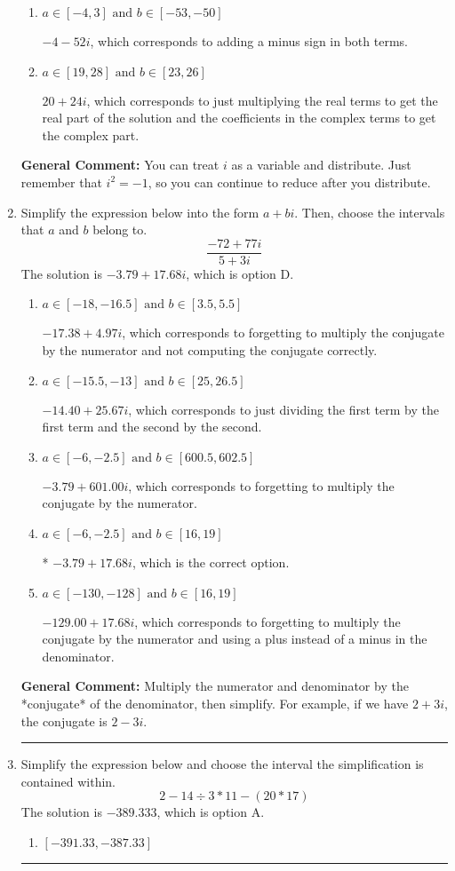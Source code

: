 \documentclass{extbook}[14pt]
\newcommand{\litem}[1]{\item #1

\rule{\textwidth}{0.4pt}}
\begin{document}
\begin{enumerate}
{\begin{enumerate}[label=\Alph*.]
* $-4 + 52 i$, which is the correct option.
\item \( a \in [-4, 3] \text{ and } b \in [-53, -50] \)

 $-4 - 52 i$, which corresponds to adding a minus sign in both terms.
\item \( a \in [19, 28] \text{ and } b \in [23, 26] \)

 $20 + 24 i$, which corresponds to just multiplying the real terms to get the real part of the solution and the coefficients in the complex terms to get the complex part.
\end{enumerate}

\textbf{General Comment:} You can treat $i$ as a variable and distribute. Just remember that $i^2=-1$, so you can continue to reduce after you distribute.
}
\litem{
Simplify the expression below into the form $a+bi$. Then, choose the intervals that $a$ and $b$ belong to.
\[ \frac{-72 + 77 i}{5 + 3 i} \]The solution is \( -3.79  + 17.68 i \), which is option D.\begin{enumerate}[label=\Alph*.]
\item \( a \in [-18, -16.5] \text{ and } b \in [3.5, 5.5] \)

 $-17.38  + 4.97 i$, which corresponds to forgetting to multiply the conjugate by the numerator and not computing the conjugate correctly.
\item \( a \in [-15.5, -13] \text{ and } b \in [25, 26.5] \)

 $-14.40  + 25.67 i$, which corresponds to just dividing the first term by the first term and the second by the second.
\item \( a \in [-6, -2.5] \text{ and } b \in [600.5, 602.5] \)

 $-3.79  + 601.00 i$, which corresponds to forgetting to multiply the conjugate by the numerator.
\item \( a \in [-6, -2.5] \text{ and } b \in [16, 19] \)

* $-3.79  + 17.68 i$, which is the correct option.
\item \( a \in [-130, -128] \text{ and } b \in [16, 19] \)

 $-129.00  + 17.68 i$, which corresponds to forgetting to multiply the conjugate by the numerator and using a plus instead of a minus in the denominator.
\end{enumerate}

\textbf{General Comment:} Multiply the numerator and denominator by the *conjugate* of the denominator, then simplify. For example, if we have $2+3i$, the conjugate is $2-3i$.
}
\litem{
Simplify the expression below and choose the interval the simplification is contained within.
\[ 2 - 14 \div 3 * 11 - (20 * 17) \]The solution is \( -389.333 \), which is option A.\begin{enumerate}[label=\Alph*.]
\item \( [-391.33, -387.33] \)


\end{enumerate}}
\end{enumerate}
\end{document}
